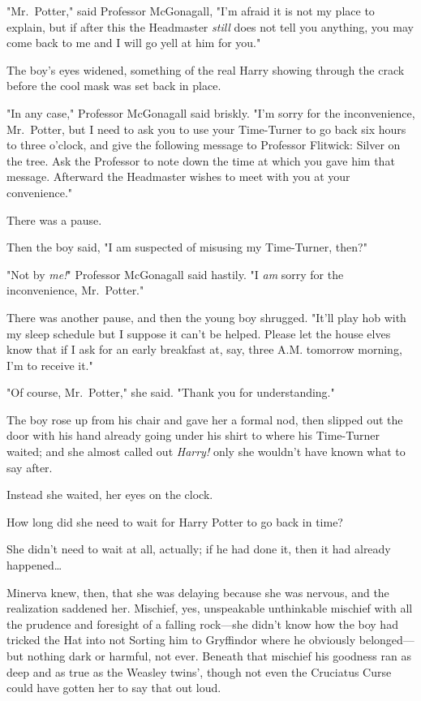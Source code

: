 "Mr.~Potter," said Professor McGonagall, "I'm afraid it is not my place to 
explain, but if after this the Headmaster \emph{still} does not tell you 
anything, you may come back to me and I will go yell at him for you."

The boy's eyes widened, something of the real Harry showing through the crack 
before the cool mask was set back in place.

"In any case," Professor McGonagall said briskly. "I'm sorry for the 
inconvenience, Mr.~Potter, but I need to ask you to use your Time-Turner to go 
back six hours to three o'clock, and give the following message to Professor 
Flitwick: Silver on the tree. Ask the Professor to note down the time at which 
you gave him that message. Afterward the Headmaster wishes to meet with you at 
your convenience."

There was a pause.

Then the boy said, "I am suspected of misusing my Time-Turner, then?"

"Not by \emph{me!}" Professor McGonagall said hastily. "I \emph{am} sorry for 
the inconvenience, Mr.~Potter."

There was another pause, and then the young boy shrugged. "It'll play hob with 
my sleep schedule but I suppose it can't be helped. Please let the house elves 
know that if I ask for an early breakfast at, say, three A.M. tomorrow morning, 
I'm to receive it."

"Of course, Mr.~Potter," she said. "Thank you for understanding."

The boy rose up from his chair and gave her a formal nod, then slipped out the 
door with his hand already going under his shirt to where his Time-Turner 
waited; and she almost called out \emph{Harry!} only she wouldn't have known 
what to say after.

Instead she waited, her eyes on the clock.

How long did she need to wait for Harry Potter to go back in time?

She didn't need to wait at all, actually; if he had done it, then it had 
already happened{\ldots}

Minerva knew, then, that she was delaying because she was nervous, and the 
realization saddened her. Mischief, yes, unspeakable unthinkable mischief with 
all the prudence and foresight of a falling rock---she didn't know how the boy 
had tricked the Hat into not Sorting him to Gryffindor where he obviously 
belonged---but nothing dark or harmful, not ever. Beneath that mischief his 
goodness ran as deep and as true as the Weasley twins', though not even the 
Cruciatus Curse could have gotten her to say that out loud.

